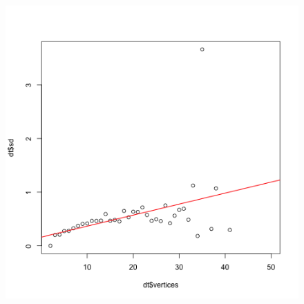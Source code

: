 \documentclass[paper=a4, fontsize=11pt]{scrartcl} %
\begin{document}
\begin{figure}
\begin{minipage}{.5\textwidth}
  \includegraphics[width=\linewidth]{homoscedasticity_Basque.png}
  \label{fig:12}
\end{minipage}
\end{figure}
\end{document}
